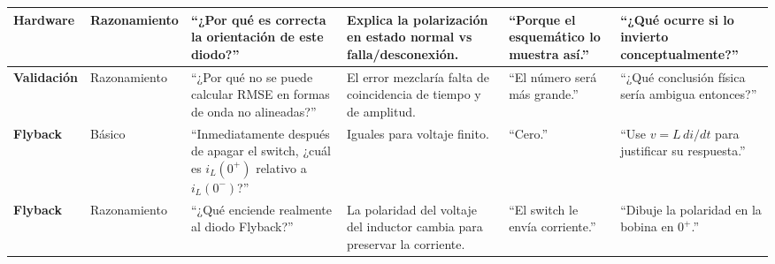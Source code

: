 \documentclass[10pt, a4paper, landscape]{article}
\begin{document}
\begin{tabularx}{\textwidth}{>{\bfseries}l l X X X X}
Hardware & Razonamiento & ``¿Por qué es correcta la orientación de este diodo?'' & Explica la polarización en estado normal vs falla/desconexión. & ``Porque el esquemático lo muestra así.'' & ``¿Qué ocurre si lo invierto conceptualmente?'' \\
\midrule
Validación & Razonamiento & ``¿Por qué no se puede calcular RMSE en formas de onda no alineadas?'' & El error mezclaría falta de coincidencia de tiempo y de amplitud. & ``El número será más grande.'' & ``¿Qué conclusión física sería ambigua entonces?'' \\
\midrule
Flyback & Básico & ``Inmediatamente después de apagar el switch, ¿cuál es $i_L(0^+)$ relativo a $i_L(0^-)$?'' & Iguales para voltaje finito. & ``Cero.'' & ``Use $v=L\,di/dt$ para justificar su respuesta.'' \\
\midrule
Flyback & Razonamiento & ``¿Qué enciende realmente al diodo Flyback?'' & La polaridad del voltaje del inductor cambia para preservar la corriente. & ``El switch le envía corriente.'' & ``Dibuje la polaridad en la bobina en $0^+$.'' \\
\bottomrule
\end{tabularx}
\end{document}
